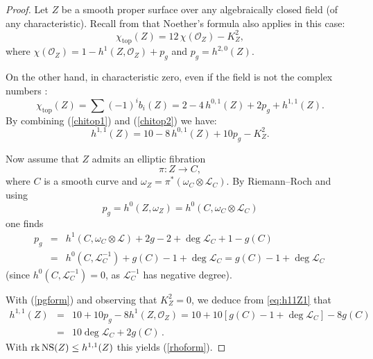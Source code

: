 \documentclass[11pt]{amsart}
\theoremstyle{definition}
\theoremstyle{definition}
\theoremstyle{remark}
\theoremstyle{remark}
\theoremstyle{definition}
\theoremstyle{conjecture}
\begin{document}
\begin{proof}Let $Z$ be a smooth proper surface over any algebraically closed field (of any characteristic).  Recall from  \cite{PieneNoether} that Noether's formula also applies in this case:
\begin{equation} \label{chitop1}
    \chi_{\mathrm{top}}(Z)=12\,\chi(\mathcal O_Z)-K_Z^2,
\end{equation}
where $
\chi(\mathcal O_Z)=1-h^1(Z,\mathcal O_Z) +p_g$ and
$p_g=h^{2,0}(Z)$.

On the other hand, in characteristic zero, even if the field is not the complex numbers \cite[Theorem 5.5]{Deligne1968}:
\begin{equation} \label{chitop2}
\chi_{\mathrm{top}}(Z)=\sum (-1)^i b_i (Z)=2-4\,h^{0,1}(Z)+2p_g+h^{1,1}(Z).
\end{equation}
By combining  (\ref{chitop1}) and (\ref{chitop2}) we have:
\begin{equation} \label{eq:h11Z1}
h^{1,1}(Z)=10-8\,h^{0,1}(Z)+10p_g-K_Z^2.
\end{equation}

\medskip

Now assume that $Z$ admits an elliptic fibration
\[
\pi \colon Z \to C,
\]
where $C$ is a smooth curve and $\omega_Z= \pi^*(\omega_C \otimes \mathcal{L}_C)$.
 By Riemann--Roch and using 
\[
p_g = h^0(Z,\omega_Z)=h^0(C,\omega_C \otimes\mathcal{L}_C) 
\] one finds
\begin{eqnarray} \label{pgform}
p_g&=&h^1(C,\omega_C\otimes\mathcal{L})+2g-2+\deg  \mathcal{L}_C + 1-g(C) \nonumber \\ &=& 
 h^0(C,\mathcal{L}^{-1}_C)+g(C)-1+ \deg {\mathcal L}_C   
= g(C)-1+\deg  \mathcal{L}_C \,
\end{eqnarray}
(since $h^0(C,{\mathcal L}_C^{-1})=0$, as ${\mathcal L}_C^{-1}$ has
negative degree).

{With (\ref{pgform}) and observing that $K_Z^2 =0$, we deduce from \eqref{eq:h11Z1} that}
\begin{eqnarray}
h^{1,1}(Z)
&=&10+10p_g-8h^1(Z,\mathcal O_Z)
=10+10[g(C)-1+ \deg {\mathcal L}_C  ]-8g(C) \nonumber \\
&=&10  \deg {\mathcal L}_C  +2g(C) \,. \nonumber
\end{eqnarray}
With $\mathrm{rk}\, {\rm NS}(Z) \leq h^{1,1}(Z)$ this yields (\ref{rhoform}). \end{proof}
\smallskip
\end{document}

